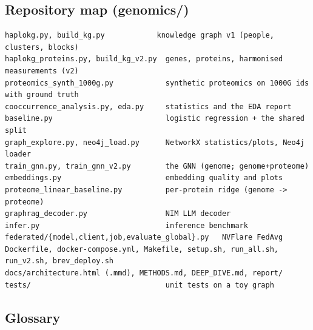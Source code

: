 \documentclass[11pt,a4paper]{article}
\begin{document}
\subsection{Repository map (genomics/)}

\begin{small}\begin{verbatim}
haplokg.py, build_kg.py            knowledge graph v1 (people, clusters, blocks)
haplokg_proteins.py, build_kg_v2.py  genes, proteins, harmonised measurements (v2)
proteomics_synth_1000g.py            synthetic proteomics on 1000G ids with ground truth
cooccurrence_analysis.py, eda.py     statistics and the EDA report
baseline.py                          logistic regression + the shared split
graph_explore.py, neo4j_load.py      NetworkX statistics/plots, Neo4j loader
train_gnn.py, train_gnn_v2.py        the GNN (genome; genome+proteome)
embeddings.py                        embedding quality and plots
proteome_linear_baseline.py          per-protein ridge (genome -> proteome)
graphrag_decoder.py                  NIM LLM decoder
infer.py                             inference benchmark
federated/{model,client,job,evaluate_global}.py   NVFlare FedAvg
Dockerfile, docker-compose.yml, Makefile, setup.sh, run_all.sh, run_v2.sh, brev_deploy.sh
docs/architecture.html (.mmd), METHODS.md, DEEP_DIVE.md, report/
tests/                               unit tests on a toy graph
\end{verbatim}\end{small}

\subsection{Glossary}
\end{document}
